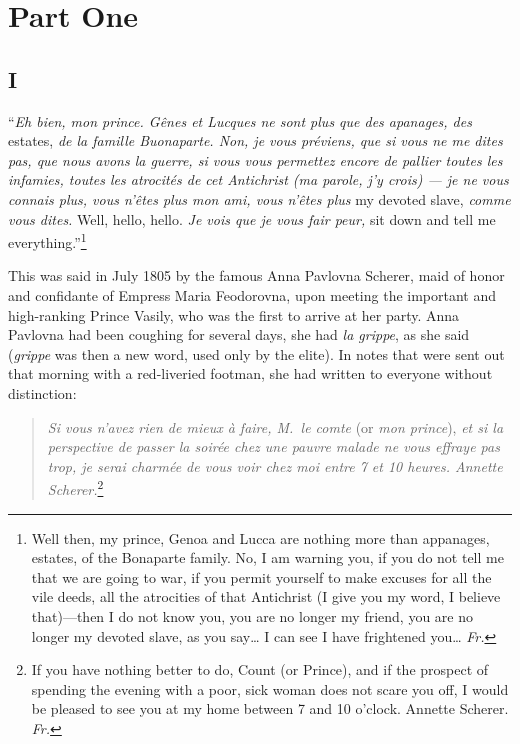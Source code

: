 
\chapter*{Part One} %

\section*{I} %

``\textit{Eh bien, mon prince. G\^enes et Lucques ne sont plus que des apanages, des} estates, \textit{de la famille Buonaparte. Non, je vous pr\'eviens, que si vous ne me dites pas, que nous avons la guerre, si vous vous permettez encore de pallier toutes les infamies, toutes les atrocit\'es de cet Antichrist (ma parole, j'y crois) --- je ne vous connais plus, vous n'\^etes plus mon ami, vous n'\^etes plus} my devoted slave, \textit{comme vous dites.} Well, hello, hello. \textit{Je vois que je vous fair peur,} sit down and
tell me everything.''\footnote{Well then, my prince, Genoa and Lucca are nothing more than appanages, estates, of the Bonaparte family. No, I am warning you, if you do not tell me that we are going to war, if you permit yourself to make excuses for all the vile deeds, all the atrocities of that Antichrist (I give you my word, I believe that)---then I do not know you, you are no longer my friend, you are no longer my devoted slave, as you say\ldots{} I can see I have frightened you\ldots{} \textit{Fr.}} %

This was said in July 1805 by the famous Anna Pavlovna Scherer, maid of honor and confidante of Empress Maria Feodorovna, upon meeting the important and high-ranking Prince Vasily, who was the first to arrive at her party. Anna Pavlovna had been coughing for several days, she had \textit{la grippe}, as she said (\textit{grippe} was then a new word, used only by the elite). In notes that were sent out that morning with a red-liveried footman, she had written to everyone without distinction:

\begin{quote}
\textit{Si vous n'avez rien de mieux \`a faire, M.~le comte} (or \textit{mon prince}), \textit{et si la perspective de passer la soir\'ee chez une pauvre malade ne vous effraye pas trop, je serai charm\'ee de vous voir chez moi entre 7 et 10 heures. Annette Scherer.}\footnote{If you have nothing better to do, Count (or Prince), and if the prospect of spending the evening with a poor, sick woman does not scare you off, I would be pleased to see you at my home between 7 and 10 o'clock. Annette Scherer. \textit{Fr.}}
\end{quote}

